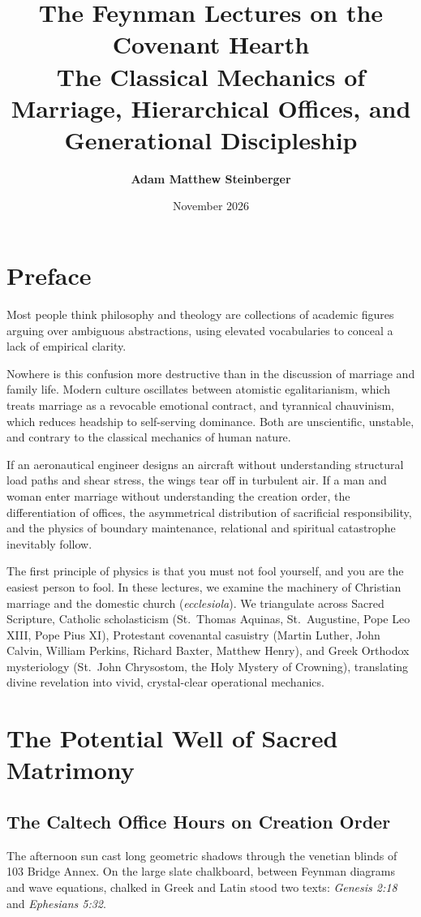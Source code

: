 \documentclass[11pt]{report}
\title{\Huge\textbf{The Feynman Lectures on the Covenant Hearth}\\
\Large The Classical Mechanics of Marriage, Hierarchical Offices, and Generational Discipleship}
\author{\textbf{Adam Matthew Steinberger}}
\date{November 2026}
\begin{document}
\maketitle

\tableofcontents
\newpage

\chapter*{Preface}

Most people think philosophy and theology are collections of academic figures arguing over ambiguous abstractions, using elevated vocabularies to conceal a lack of empirical clarity.

Nowhere is this confusion more destructive than in the discussion of marriage and family life. Modern culture oscillates between atomistic egalitarianism, which treats marriage as a revocable emotional contract, and tyrannical chauvinism, which reduces headship to self-serving dominance. Both are unscientific, unstable, and contrary to the classical mechanics of human nature.

If an aeronautical engineer designs an aircraft without understanding structural load paths and shear stress, the wings tear off in turbulent air. If a man and woman enter marriage without understanding the creation order, the differentiation of offices, the asymmetrical distribution of sacrificial responsibility, and the physics of boundary maintenance, relational and spiritual catastrophe inevitably follow.

The first principle of physics is that you must not fool yourself, and you are the easiest person to fool. In these lectures, we examine the machinery of Christian marriage and the domestic church (\textit{ecclesiola}). We triangulate across Sacred Scripture, Catholic scholasticism (St.~Thomas Aquinas, St.~Augustine, Pope Leo XIII, Pope Pius XI), Protestant covenantal casuistry (Martin Luther, John Calvin, William Perkins, Richard Baxter, Matthew Henry), and Greek Orthodox mysteriology (St.~John Chrysostom, the Holy Mystery of Crowning), translating divine revelation into vivid, crystal-clear operational mechanics.

\chapter{The Potential Well of Sacred Matrimony}

\section{The Caltech Office Hours on Creation Order}
The afternoon sun cast long geometric shadows through the venetian blinds of 103 Bridge Annex. On the large slate chalkboard, between Feynman diagrams and wave equations, chalked in Greek and Latin stood two texts: \textit{Genesis 2:18} and \textit{Ephesians 5:32}.
\end{document}

